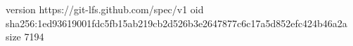version https://git-lfs.github.com/spec/v1
oid sha256:1ed93619001fdc5fb15ab219cb2d526b3e2647877c6c17a5d852efc424b46a2a
size 7194
